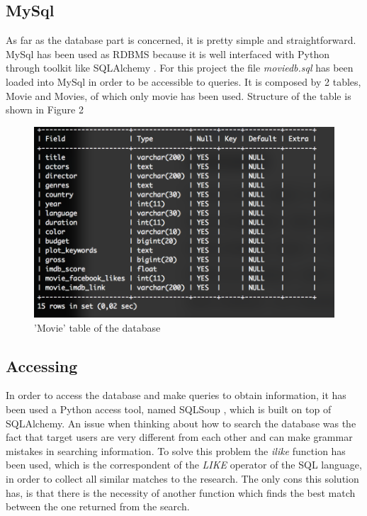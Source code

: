 \documentclass[11pt,a4paper]{article}
\begin{document}
	\subsection{MySql}
	
	As far as the database part is concerned, it is pretty simple and straightforward. MySql has been used as RDBMS because it is well interfaced with Python through toolkit like SQLAlchemy \cite{SQLA}.
	For this project the file \textit{moviedb.sql} has been loaded into MySql in order to be accessible to queries. It is composed by 2 tables, Movie and Movies, of which only movie has been used. Structure of the table is shown in Figure 2
	
	\begin{figure}
		\includegraphics[width=\textwidth]{images/database}
		\center\caption{'Movie' table of the database}
	\end{figure}
	
	\subsection{Accessing}
	
	In order to access the database and make queries to obtain information, it has been used a Python access tool, named SQLSoup \cite{SQLS}, which is built on top of SQLAlchemy. An issue when thinking about how to search the database was the fact that target users are very different from each other and can make grammar mistakes in searching information. To solve this problem the \textit{ilike} function has been used, which is the correspondent of the \textit{LIKE} operator of the SQL language, in order to collect all similar matches to the research. The only cons this solution has, is that there is the necessity of another function which finds the best match between the one returned from the search.
	
\end{document}
